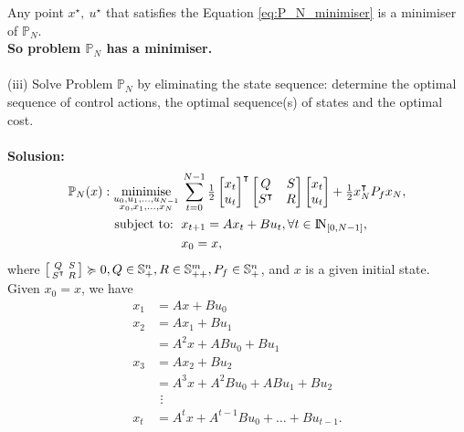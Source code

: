 \documentclass[a4paper,11pt,reqno]{amsart}
\newcommand{\N}{{\rm I\!N}}
\newcommand{\tran}{\intercal}
\DeclareMathOperator*{\minimise}{minimise}
\begin{document}
Any point $x^{\star},\ u^{\star}$ that satisfies the Equation \eqref{eq:P_N_minimiser} is a minimiser of $\mathbb{P}_N$.
\\
\textbf{So problem $\mathbb{P}_N$ has a minimiser.}
\\ \\
(iii) Solve Problem $\mathbb{P}_N$ by eliminating the state sequence: determine the optimal sequence of control actions, the optimal sequence(s) of states and the optimal cost.
\\ \\
\textbf{Solusion:}
\begin{subequations}
    \begin{align}
        \mathbb{P}_N(x): \minimise_{\substack{u_0,u_1,\ldots,u_{N-1}\\ x_0,x_1,\ldots,x_N}} \,
         & \sum_{t=0}^{N-1}\textstyle\frac{1}{2}
         \begin{bmatrix}
             x_t\\
             u_t
         \end{bmatrix}^{\tran}
         \begin{bmatrix}
             Q&S\\
             S^{\tran}&R
         \end{bmatrix}
         \begin{bmatrix}
             x_t\\
             u_t
         \end{bmatrix}
         +\frac{1}{2}x_N^{\tran}P_fx_N,
        \\
        \text{subject to: }\,
         & x_{t+1} = A x_t + B u_t, \forall t\in\N_{[0, N-1]},
        \\
         & x_{0} = x,
    \end{align}
\end{subequations}
where $\begin{bsmallmatrix}Q&S\\S^{\tran}&R\end{bsmallmatrix}\succcurlyeq 0, Q\in \mathbb{S}^n_+, R\in \mathbb{S}^m_{++}, P_f\in \mathbb{S}^n_{+}$, and $x$ is a given initial state.
\\
Given $x_{0} = x$, we have
\begin{subequations}
    \begin{align}
        x_1&=Ax+Bu_0
        \\
        x_2&=Ax_1+Bu_1
        \\
        &=A^2x+ABu_0+Bu_1
        \\
        x_3&=Ax_2+Bu_2
        \\
        &=A^3x+A^2Bu_0+ABu_1+Bu_2
        \\
        &\ \, \vdots 
        \\
        x_t&=A^{t}x+A^{t-1}Bu_0+\ldots +Bu_{t-1}.
    \end{align}
\end{subequations}
\end{document}
